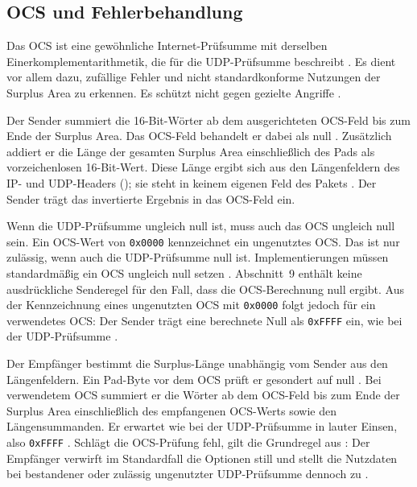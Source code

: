 \subsection{OCS und Fehlerbehandlung}
\label{subsec:surplus-ocs}

Das OCS ist eine gewöhnliche Internet-Prüfsumme mit derselben Einerkomplement\-arithmetik, die
 für die UDP-Prüfsumme beschreibt \cite{rfc1071}. Es dient vor allem dazu,
zufällige Fehler und nicht standardkonforme Nutzungen der Surplus Area zu erkennen. Es schützt nicht gegen
gezielte Angriffe \cite[Sec.~9]{rfc9868}.

Der Sender summiert die 16-Bit-Wörter ab dem ausgerichteten OCS-Feld bis zum Ende der Surplus Area. Das
OCS-Feld behandelt er dabei als null \cite[Sec.~8 und 9]{rfc9868}. Zusätzlich addiert er die Länge der
gesamten Surplus Area einschließlich des Pads als vorzeichenlosen 16-Bit-Wert. Diese Länge ergibt sich aus
den Längenfeldern des IP- und UDP-Headers (); sie steht in keinem eigenen Feld des
Pakets \cite[Sec.~9]{rfc9868}. Der Sender trägt das invertierte Ergebnis in das OCS-Feld ein.

Wenn die UDP-Prüfsumme ungleich null ist, muss auch das OCS ungleich null sein. Ein OCS-Wert von
\texttt{0x0000} kennzeichnet ein ungenutztes OCS. Das ist nur zulässig, wenn auch die UDP-Prüfsumme null ist.
Implementierungen müssen standardmäßig ein OCS ungleich null setzen \cite[Sec.~9]{rfc9868}. Abschnitt~9
enthält keine ausdrückliche Senderegel für den Fall, dass die OCS-Berechnung null ergibt. Aus der
Kennzeichnung eines ungenutzten OCS mit \texttt{0x0000} folgt jedoch für ein verwendetes OCS: Der Sender
trägt eine berechnete Null als \texttt{0xFFFF} ein, wie bei der UDP-Prüfsumme \cite{rfc768}.

Der Empfänger bestimmt die Surplus-Länge unabhängig vom Sender aus den Längenfeldern. Ein Pad-Byte vor dem
OCS prüft er gesondert auf null \cite[Sec.~8 und 9]{rfc9868}. Bei verwendetem OCS summiert er die Wörter ab
dem OCS-Feld bis zum Ende der Surplus Area einschließlich des empfangenen OCS-Werts sowie den
Längensummanden. Er erwartet wie bei der UDP-Prüfsumme in  lauter Einsen, also
\texttt{0xFFFF} \cite{rfc1071}. Schlägt die OCS-Prüfung fehl, gilt die Grundregel aus
: Der Empfänger verwirft im Standardfall die Optionen still und stellt die
Nutzdaten bei bestandener oder zulässig ungenutzter UDP-Prüfsumme dennoch zu \cite[Sec.~9]{rfc9868}.

